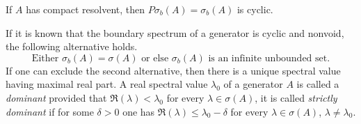 \begin{corollary}\label{cor:b3-2.10}
If $A$ has compact resolvent, then $P\sigma_{b}(A) = \sigma_{b}(A)$ is cyclic.
\end{corollary}
If it is known that the boundary spectrum of a generator is cyclic and nonvoid, the following alternative holds.
\begin{equation}\label{eq:b3-2.19}
\text{Either $\sigma_{b}(A) = \sigma(A)$ or else  $\sigma_{b}(A)$ is an infinite unbounded set.}
\end{equation}
If one can exclude the second alternative, then there is a unique spectral value having maximal real part.
A real spectral value $\lambda_{0}$ of a generator $A$ is called a \emph{dominant} provided that $\Re(\lambda) < \lambda_{0}$ for every $\lambda \in \sigma(A)$, it is called \emph{strictly dominant} if for some $\delta > 0$ one has $\Re(\lambda) \leq \lambda_{0} - \delta$ for every $\lambda \in \sigma(A)$, $\lambda \neq \lambda_{0}$.

